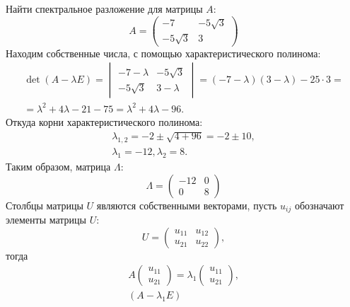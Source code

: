 \begin{example}
    Найти спектральное разложение для матрицы $A$:
    \[
        A
        = \begin{pmatrix}
              -7          & -5 \sqrt{3} \\
              -5 \sqrt{3} & 3
        \end{pmatrix}
    \]
    Находим собственные числа, с помощью характеристического полинома:
    \begin{multline*}
        \det \left ( A - \lambda E \right )
        = \begin{vmatrix}
              -7 - \lambda & -5 \sqrt{3} \\
              -5 \sqrt{3}  & 3 - \lambda
        \end{vmatrix}
        = (-7 - \lambda)(3 - \lambda) - 25 \cdot 3 = \\
        = \lambda^2 + 4 \lambda - 21 - 75
        = \lambda^2 + 4 \lambda - 96.
    \end{multline*}
    Откуда корни характеристического полинома:
    \begin{gather*}
        \lambda_{1,2} = -2 \pm \sqrt{4 + 96} = -2 \pm 10 , \\
        \lambda_1 = -12, \lambda_2 = 8.
    \end{gather*}
    Таким образом, матрица $\Lambda$:
    \[
        \Lambda
        = \begin{pmatrix}
              -12 & 0 \\
              0   & 8
        \end{pmatrix}
    \]
    Столбцы матрицы $U$ являются собственными векторами, пусть $u_{ij}$ обозначают элементы матрицы $U$:
    \[
        U
        = \begin{pmatrix}
              u_{11} & u_{12} \\
              u_{21} & u_{22}
        \end{pmatrix} ,
    \]
    тогда
    \begin{gather*}
        A
        \begin{pmatrix}
            u_{11} \\
            u_{21}
        \end{pmatrix}
        = \lambda_1
        \begin{pmatrix}
            u_{11} \\
            u_{21}
        \end{pmatrix} , \\
        \left ( A - \lambda_1 E \right )

\end{gather*}
\end{example}

